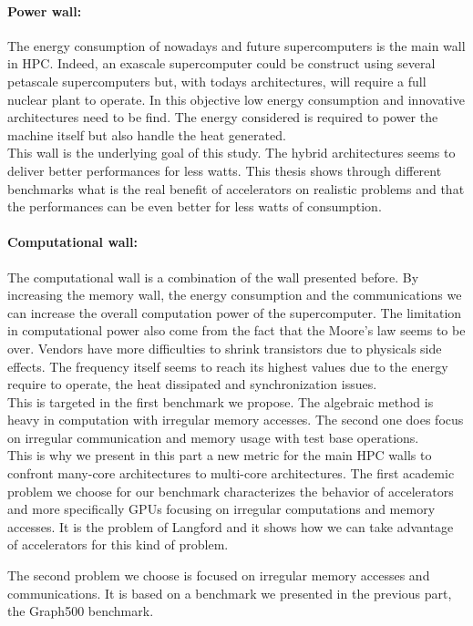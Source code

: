 \paragraph{Power wall: }
The energy consumption of nowadays and future supercomputers is the main wall in HPC. 
Indeed, an exascale supercomputer could be construct using several petascale supercomputers but, with todays architectures, will require a full nuclear plant to operate. 
In this objective low energy consumption and innovative architectures need to be find. 
The energy considered is required to power the machine itself but also handle the heat generated.\\

This wall is the underlying goal of this study. 
The hybrid architectures seems to deliver better performances for less watts.
This thesis shows through different benchmarks what is the real benefit of accelerators on realistic problems and that the performances can be even better for less watts of consumption.

\paragraph{Computational wall: }
The computational wall is a combination of the wall presented before. 
By increasing the memory wall, the energy consumption and the communications we can increase the overall computation power of the supercomputer. 
The limitation in computational power also come from the fact that the Moore's law seems to be over. 
Vendors have more difficulties to shrink transistors due to physicals side effects. 
The frequency itself seems to reach its highest values due to the energy require to operate, the heat dissipated and synchronization issues.\\ 

This is targeted in the first benchmark we propose. 
The algebraic method is heavy in computation with irregular memory accesses. 
The second one does focus on irregular communication and memory usage with test base operations.\\

This is why we present in this part a new metric for the main HPC walls to confront many-core architectures to multi-core architectures. 
The first academic problem we choose for our benchmark characterizes the behavior of accelerators and more specifically GPUs focusing on irregular computations and memory accesses. 
It is the problem of Langford and it shows how we can take advantage of accelerators for this kind of problem. 

The second problem we choose is focused on irregular memory accesses and communications. 
It is based on a benchmark we presented in the previous part, the Graph500 benchmark.